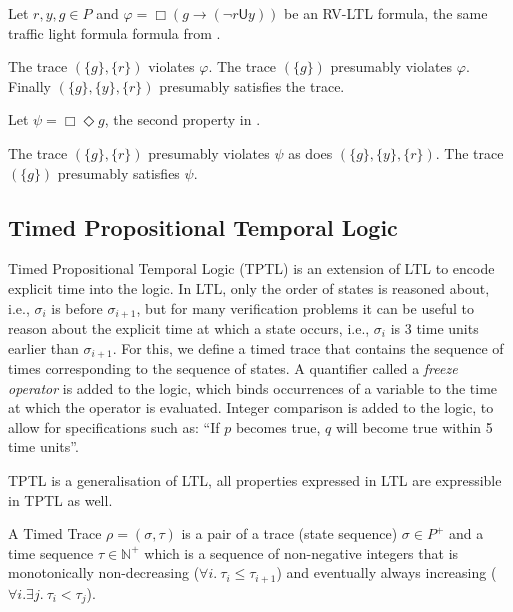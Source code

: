 \documentclass[a4paper]{article}
\newcommand{\U}{\mathsf{U}}
\begin{document}
\begin{eg}
Let $r,y,g\in P$ and $\varphi = \Box (g \to (\neg r \U y))$ be an RV-LTL formula, the same traffic light formula formula from .

  The trace $(\{g\},\{r\})$ violates $\varphi$. The trace $(\{g\})$ presumably violates $\varphi$. Finally $(\{g\},\{y\},\{r\})$ presumably satisfies the trace.

  Let $\psi = \Box \Diamond g $, the second property in .

  The trace $(\{g\},\{r\})$ presumably violates $\psi$ as does $(\{g\},\{y\},\{r\})$. The trace $(\{g\})$ presumably satisfies $\psi$.
\end{eg}

\subsection{Timed Propositional Temporal Logic}
Timed Propositional Temporal Logic (TPTL)\autocite{alur1994really} is an extension of LTL to encode explicit time into the logic.
In LTL, only the order of states is reasoned about, i.e., $\sigma_i$ is before $\sigma_{i+1}$, but for many verification problems it can be useful to reason about the explicit time at which a state occurs, i.e., $\sigma_i$ is 3 time units earlier than $\sigma_{i+1}$.
For this, we define a timed trace that contains the sequence of times corresponding to the sequence of states.
A quantifier called a \emph{freeze operator} is added to the logic, which binds occurrences of a variable to the time at which the operator is evaluated.
Integer comparison is added to the logic, to allow for specifications such as: ``If $p$ becomes true, $q$ will become true within 5 time units''.

TPTL is a generalisation of LTL, all properties expressed in LTL are expressible in TPTL as well.



\begin{defn}

  A Timed Trace $\rho = (\sigma,\tau)$ is a pair of a trace (state sequence) $\sigma \in P^+$ and a time sequence $\tau \in \mathbb{N}^+$ which is a sequence of non-negative integers that is monotonically non-decreasing ($\forall i. ~\tau_i \leq \tau_{i+1}$) and eventually always increasing ($\forall i. \exists j. ~\tau_i < \tau_j$).
\end{defn}
\end{document}
